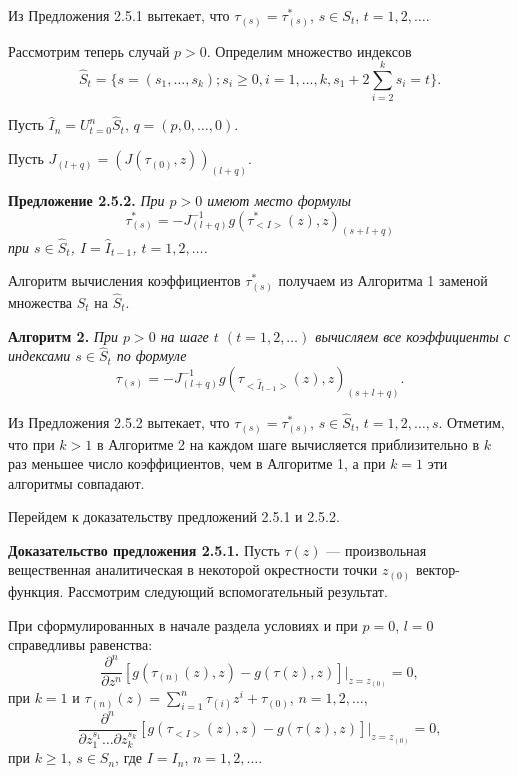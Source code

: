                     Из Предложения 2.5.1 вытекает, что $\tau_{(s)}=\tau^*_{(s)}$, $s\in
                    S_t$, $t=1,2,\ldots$.

                    Рассмотрим теперь случай $p>0$. Определим множество индексов
                    $$
                    \hat S_t=\{s=(s_1,\ldots,s_k);s_i\geq
                    0,i=1,\ldots,k,s_1+2\sum^k_{i=2} s_i=t\}.
                    $$

                    Пусть $\hat I_n= U^n_{t=0}\hat S_t$, $q=(p,0,\ldots,0)$.

                    Пусть $J_{(l+q)}=\left(J(\tau_{(0)},z)\right)_{(l+q)}$.


                    \textbf{ Предложение 2.5.2.} \textit{ При $p>0$ имеют место формулы
                    $$
                    \tau^*_{(s)}=-J^{-1}_{(l+q)}
                    g\left(\tau^*_{<I>}(z),z\right)_{(s+l+q)}
                    $$
                        при $s\in \hat S_t$, $I=\hat I_{t-1}$, $t=1,2,\ldots$. }

                        Алгоритм вычисления коэффициентов $\tau^*_{(s)}$ получаем из
                        Алгоритма 1 заменой множества $S_t$ на $\hat S_t$.


                        \textbf{ Алгоритм 2.} \textit{ При $p>0$ на шаге $t$ $(t=1,2,\ldots)$
                            вычисляем все коэффициенты с индексами $s\in\hat S_t$ по формуле
                                $$
                                \tau_{(s)}=-J^{-1}_{(l+q)} g\left(\tau_{<\hat
                                        I_{t-1}>}(z),z\right)_{(s+l+q)}.
                                $$
                        }

Из Предложения 2.5.2 вытекает, что $\tau_{(s)}=\tau^*_{(s)}$, $s\in
\hat S_t$, $t=1,2,\ldots,s$. Отметим, что при $k>1$ в Алгоритме 2 на
каждом шаге вычисляется приблизительно в $k$ раз меньшее число
коэффициентов, чем в Алгоритме 1, а при $k=1$ эти алгоритмы
совпадают.

Перейдем к доказательству предложений  2.5.1 и 2.5.2.

\textbf{ Доказательство предложения 2.5.1.} Пусть $\tau(z)$ ---
произвольная вещественная аналитическая в некоторой окрестности
точки $z_{(0)}$ вектор- функция. Рассмотрим следующий
вспомогательный результат.

\begin{lem}
 \label{th:ageom<cq}
 При сформулированных в начале раздела  условиях и при $p=0$, $l=0$
 справедливы равенства:
 $$
 \frac{\partial^n}{\partial z^n}\left[g\left(\tau_{(n)}(z),z\right)-
 g\left(\tau(z),z\right)\right]|_{z=z_{(0)}}=0,
 $$
 при $k=1$ и $\tau_{(n)}(z)=\sum^n_{i=1}\tau_{(i)}z^i+\tau_{(0)}$,
 $n=1,2,\ldots$,
 $$
 \frac{\partial^n}{\partial z^{s_1}_1\ldots\partial z^{s_k}_k} \left[
     g\left(\tau_{<I>}(z),z\right)-g\left(\tau(z),z\right)\right]|_{z=z_{(0)}}=0,
     $$
     при $k\geq 1$, $s\in S_n$, где $I=I_n$, $n=1,2,\ldots$.
     \end{lem}

